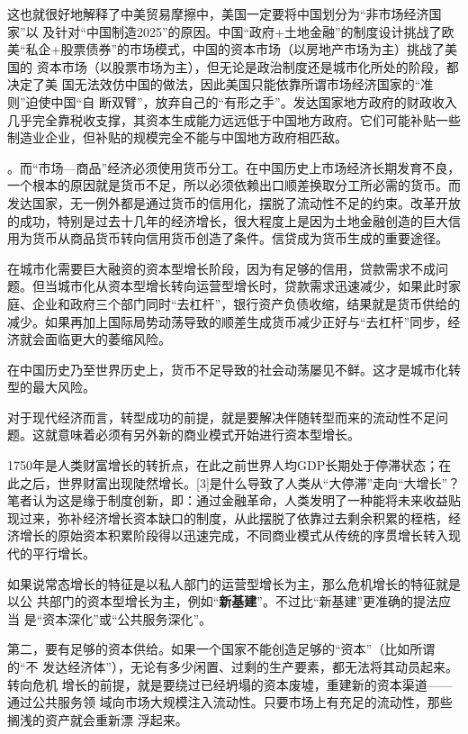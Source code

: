 这也就很好地解释了中美贸易摩擦中，美国一定要将中国划分为“非市场经济国家”以
及针对“中国制造2025”的原因。中国“政府+土地金融”的制度设计挑战了欧
美“私企+股票债券”的市场模式，中国的资本市场（以房地产市场为主）挑战了美国的
资本市场（以股票市场为主），但无论是政治制度还是城市化所处的阶段，都决定了美
国无法效仿中国的做法，因此美国只能依靠所谓市场经济国家的“准则”迫使中国“自
断双臂”，放弃自己的“有形之手”。发达国家地方政府的财政收入几乎完全靠税收支撑，其资本生成能力远远低于中国地方政府。它们可能补贴一些制造业企业，但补贴的规模完全不能与中国地方政府相匹敌。

。而“市场—商品”经济必须使用货币分工。在中国历史上市场经济长期发育不良，一个根本的原因就是货币不足，所以必须依赖出口顺差换取分工所必需的货币。而发达国家，无一例外都是通过货币的信用化，摆脱了流动性不足的约束。改革开放的成功，特别是过去十几年的经济增长，很大程度上是因为土地金融创造的巨大信用为货币从商品货币转向信用货币创造了条件。信贷成为货币生成的重要途径。



在城市化需要巨大融资的资本型增长阶段，因为有足够的信用，贷款需求不成问题。但当城市化从资本型增长转向运营型增长时，贷款需求迅速减少，如果此时家庭、企业和政府三个部门同时“去杠杆”，银行资产负债收缩，结果就是货币供给的减少。如果再加上国际局势动荡导致的顺差生成货币减少正好与“去杠杆”同步，经济就会面临更大的萎缩风险。

在中国历史乃至世界历史上，货币不足导致的社会动荡屡见不鲜。这才是城市化转型的最大风险。

对于现代经济而言，转型成功的前提，就是要解决伴随转型而来的流动性不足问题。这就意味着必须有另外新的商业模式开始进行资本型增长。


1750年是人类财富增长的转折点，在此之前世界人均GDP长期处于停滞状态；在此之后，世界财富出现陡然增长。[3]是什么导致了人类从“大停滞”走向“大增长”？笔者认为这是缘于制度创新，即：通过金融革命，人类发明了一种能将未来收益贴现过来，弥补经济增长资本缺口的制度，从此摆脱了依靠过去剩余积累的桎梏，经济增长的原始资本积累阶段得以迅速完成，不同商业模式从传统的序贯增长转入现代的平行增长。

如果说常态增长的特征是以私人部门的运营型增长为主，那么危机增长的特征就是以公
共部门的资本型增长为主，例如“\textbf{新基建}”。不过比“新基建”更准确的提法应当
是“资本深化”或“公共服务深化”。

第二，要有足够的资本供给。如果一个国家不能创造足够的“资本”（比如所谓的“不
发达经济体”），无论有多少闲置、过剩的生产要素，都无法将其动员起来。转向危机
增长的前提，就是要绕过已经坍塌的资本废墟，重建新的资本渠道——通过公共服务领
域向市场大规模注入流动性。只要市场上有充足的流动性，那些搁浅的资产就会重新漂
浮起来。

